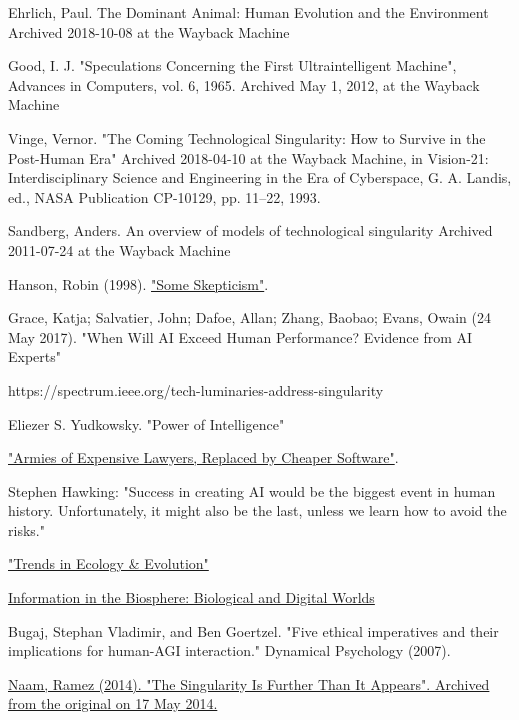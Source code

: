\documentclass[a4paper]{article}
\begin{document}
\begin{thebibliography}{9}

 Ehrlich, Paul. The Dominant Animal: Human Evolution and the Environment Archived 2018-10-08 at the Wayback Machine


  Good, I. J. "Speculations Concerning the First Ultraintelligent Machine", Advances in Computers, vol. 6, 1965. Archived May 1, 2012, at the Wayback Machine
 
   Vinge, Vernor. "The Coming Technological Singularity: How to Survive in the Post-Human Era" Archived 2018-04-10 at the Wayback Machine, in Vision-21: Interdisciplinary Science and Engineering in the Era of Cyberspace, G. A. Landis, ed., NASA Publication CP-10129, pp. 11–22, 1993.


 Sandberg, Anders. An overview of models of technological singularity Archived 2011-07-24 at the Wayback Machine

 Hanson, Robin (1998). \href{https://mason.gmu.edu/~rhanson/vc.html#hanson}{"Some Skepticism"}.

 Grace, Katja; Salvatier, John; Dafoe, Allan; Zhang, Baobao; Evans, Owain (24 May 2017). "When Will AI Exceed Human Performance? Evidence from AI Experts"

 https://spectrum.ieee.org/tech-luminaries-address-singularity

 Eliezer S. Yudkowsky. "Power of Intelligence"

\href{https://www.nytimes.com/2011/03/05/science/05legal.html}{"Armies of Expensive Lawyers, Replaced by Cheaper Software"}.

Stephen Hawking: "Success in creating AI would be the biggest event in human history. Unfortunately, it might also be the last, unless we learn how to avoid the risks."

\href{https://www.sciencedirect.com/science/article/abs/pii/S0169534703003458}{"Trends in Ecology \& Evolution"}


\href{https://escholarship.org/uc/item/38f4b791}{Information in the Biosphere: Biological and Digital Worlds}

  Bugaj, Stephan Vladimir, and Ben Goertzel. "Five ethical imperatives and their implications for human-AGI interaction." Dynamical Psychology (2007).

\href{ http://www.antipope.org/charlie/blog-static/2014/02/the-singularity-is-further-tha.html } {Naam, Ramez (2014). "The Singularity Is Further Than It Appears". Archived from the original on 17 May 2014.}


\end{thebibliography}
\end{document}
